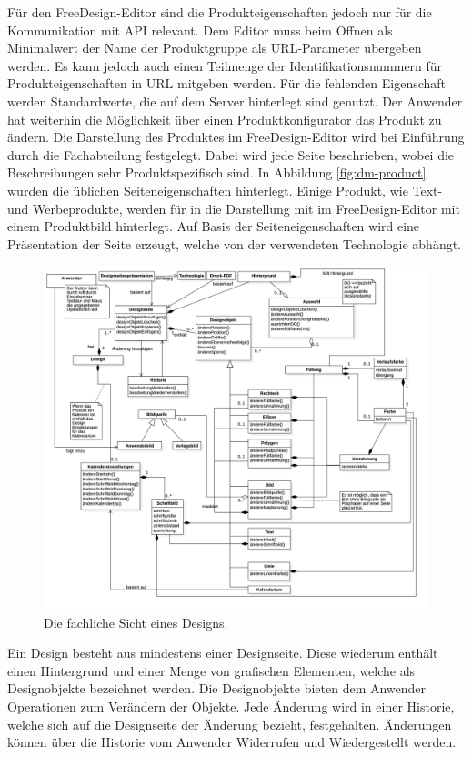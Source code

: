 Für den FreeDesign-Editor sind die Produkteigenschaften jedoch nur für die Kommunikation mit API relevant. Dem Editor muss beim Öffnen als Minimalwert der Name der Produktgruppe als URL-Parameter übergeben werden. Es kann jedoch auch einen Teilmenge der Identifikationsnummern für Produkteigenschaften in URL mitgeben werden. Für die fehlenden Eigenschaft werden Standardwerte, die auf dem Server hinterlegt sind genutzt. Der Anwender hat weiterhin die Möglichkeit über einen Produktkonfigurator das Produkt zu ändern.
Die Darstellung des Produktes im FreeDesign-Editor wird bei Einführung durch die Fachabteilung festgelegt. Dabei wird jede Seite beschrieben, wobei die Beschreibungen sehr Produktspezifisch sind. In Abbildung \ref{fig:dm-product} wurden die üblichen Seiteneigenschaften hinterlegt. Einige Produkt, wie Text- und Werbeprodukte, werden für in die Darstellung mit im FreeDesign-Editor mit einem Produktbild hinterlegt. Auf Basis der Seiteneigenschaften wird eine Präsentation der Seite erzeugt, welche von der verwendeten Technologie abhängt. 

\begin{figure}[H]
    \centering
    \caption{Die fachliche Sicht eines Designs.}
    \label{fig:dm-design}
    \includegraphics[width=1\textwidth]{diagrams/Soll-Architektur/DM-Designstruktur.png}
\end{figure}

Ein Design besteht aus mindestens einer Designseite. Diese wiederum enthält einen Hintergrund und einer Menge von grafischen Elementen, welche als Designobjekte bezeichnet werden. Die Designobjekte bieten dem Anwender Operationen zum Verändern der Objekte. Jede Änderung wird in einer Historie, welche sich auf die Designseite der Änderung bezieht, festgehalten. Änderungen können über die Historie vom Anwender Widerrufen und Wiedergestellt werden.

